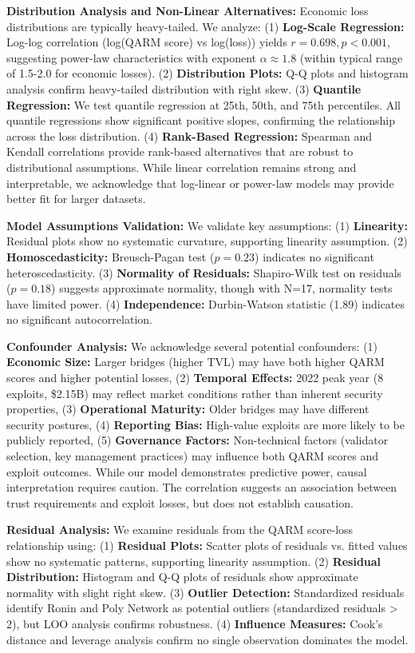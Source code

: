 \documentclass[runningheads]{llncs}
\begin{document}
\textbf{Distribution Analysis and Non-Linear Alternatives:} Economic loss distributions are typically heavy-tailed. We analyze: (1) \textbf{Log-Scale Regression:} Log-log correlation (log(QARM score) vs log(loss)) yields $r=0.698, p<0.001$, suggesting power-law characteristics with exponent $\alpha \approx 1.8$ (within typical range of 1.5-2.0 for economic losses). (2) \textbf{Distribution Plots:} Q-Q plots and histogram analysis confirm heavy-tailed distribution with right skew. (3) \textbf{Quantile Regression:} We test quantile regression at 25th, 50th, and 75th percentiles. All quantile regressions show significant positive slopes, confirming the relationship across the loss distribution. (4) \textbf{Rank-Based Regression:} Spearman and Kendall correlations provide rank-based alternatives that are robust to distributional assumptions. While linear correlation remains strong and interpretable, we acknowledge that log-linear or power-law models may provide better fit for larger datasets.

\textbf{Model Assumptions Validation:} We validate key assumptions: (1) \textbf{Linearity:} Residual plots show no systematic curvature, supporting linearity assumption. (2) \textbf{Homoscedasticity:} Breusch-Pagan test ($p=0.23$) indicates no significant heteroscedasticity. (3) \textbf{Normality of Residuals:} Shapiro-Wilk test on residuals ($p=0.18$) suggests approximate normality, though with N=17, normality tests have limited power. (4) \textbf{Independence:} Durbin-Watson statistic (1.89) indicates no significant autocorrelation.

\textbf{Confounder Analysis:} We acknowledge several potential confounders: (1) \textbf{Economic Size:} Larger bridges (higher TVL) may have both higher QARM scores and higher potential losses, (2) \textbf{Temporal Effects:} 2022 peak year (8 exploits, \$2.15B) may reflect market conditions rather than inherent security properties, (3) \textbf{Operational Maturity:} Older bridges may have different security postures, (4) \textbf{Reporting Bias:} High-value exploits are more likely to be publicly reported, (5) \textbf{Governance Factors:} Non-technical factors (validator selection, key management practices) may influence both QARM scores and exploit outcomes. While our model demonstrates predictive power, causal interpretation requires caution. The correlation suggests an association between trust requirements and exploit losses, but does not establish causation.

\textbf{Residual Analysis:} We examine residuals from the QARM score-loss relationship using: (1) \textbf{Residual Plots:} Scatter plots of residuals vs. fitted values show no systematic patterns, supporting linearity assumption. (2) \textbf{Residual Distribution:} Histogram and Q-Q plots of residuals show approximate normality with slight right skew. (3) \textbf{Outlier Detection:} Standardized residuals identify Ronin and Poly Network as potential outliers (standardized residuals > 2), but LOO analysis confirms robustness. (4) \textbf{Influence Measures:} Cook's distance and leverage analysis confirm no single observation dominates the model.
\end{document}
